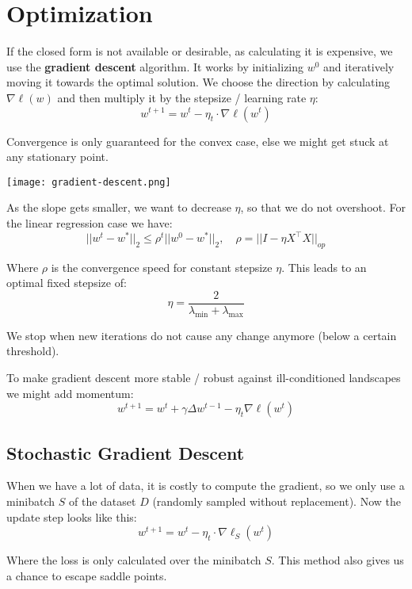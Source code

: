 \section{Optimization}

If the closed form is not available or desirable, as calculating it is expensive, we use the \textbf{gradient descent} algorithm. It works by initializing $w^0$ and iteratively moving it towards the optimal solution. We choose the direction by calculating $\nabla \ell(w)$ and then multiply it by the stepsize / learning rate $\eta$:
$$w^{t+1} = w^t - \eta_t \cdot \nabla \ell(w^t)$$

Convergence is only guaranteed for the convex case, else we might get stuck at any stationary point. 

\begin{center}
	\texttt{[image: gradient-descent.png]}
\end{center}

As the slope gets smaller, we want to decrease $\eta$, so that we do not overshoot. For the linear regression case we have:
$$||w^t - w^*||_2 \leq \rho^t ||w^0 - w^*||_2, \quad \rho = ||I - \eta X^\top X||_{op}$$

Where $\rho$ is the convergence speed for constant stepsize $\eta$. This leads to an optimal fixed stepsize of:
$$\eta = \frac{2}{\lambda_{\text{min}} + \lambda_{\text{max}}}$$

We stop when new iterations do not cause any change anymore (below a certain threshold).

\columnbreak

To make gradient descent more stable / robust against ill-conditioned landscapes we might add momentum:
$$w^{t+1} = w^t + \gamma \Delta w^{t-1} - \eta_t \nabla \ell(w^t)$$

\subsection{Stochastic Gradient Descent}

When we have a lot of data, it is costly to compute the gradient, so we only use a minibatch $S$ of the dataset $D$ (randomly sampled without replacement). Now the update step looks like this:
$$w^{t+1} = w^t - \eta_t \cdot \nabla \ell_S(w^t)$$

Where the loss is only calculated over the minibatch $S$. This method also gives us a chance to escape saddle points.